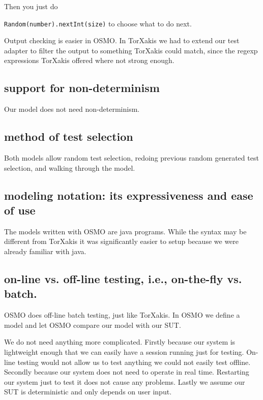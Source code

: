 \documentclass[11pt,a4paper]{article}
\begin{document}
Then you just do

\verb|Random(number).nextInt(size)| to choose what to do next.

Output checking is easier in OSMO. In TorXakis we had to extend our
test adapter to filter the output to something TorXakis could match,
since the regexp expressions TorXakis offered where not strong enough.

\subsection{support for non-determinism}
Our model does not need non-determinism.

\subsection{method of test selection}
Both models allow random test selection, redoing previous random
generated test selection, and walking through the model.
\subsection{modeling notation: its expressiveness and ease of use}

The models written with OSMO are java programs. While the syntax may
be different from TorXakis it was significantly easier to setup
because we were already familiar with java.

\subsection{on-line vs. off-line testing, i.e., on-the-fly vs. batch.}

OSMO does off-line batch testing, just like TorXakis. In OSMO we
define a model and let OSMO compare our model with our SUT.

We do not need anything more complicated. Firstly because our system
is lightweight enough that we can easily have a session running just
for testing. On-line testing would not allow us to test anything we
could not easily test offline. Secondly because our system does not
need to operate in real time. Restarting our system just to test it
does not cause any problems. Lastly we assume our SUT is deterministic
and only depends on user input.
\end{document}
